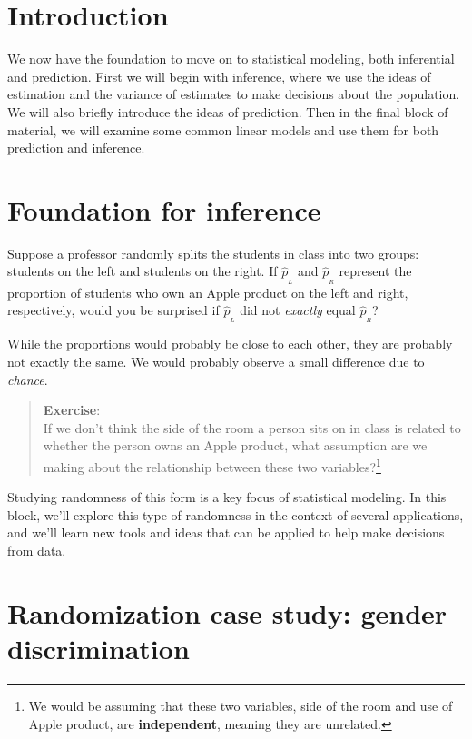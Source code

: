 \documentclass[
  letterpaper,
  DIV=11,
  numbers=noendperiod]{scrreprt}
\begin{document}
\section{Introduction}\label{introduction}

We now have the foundation to move on to statistical modeling, both
inferential and prediction. First we will begin with inference, where we
use the ideas of estimation and the variance of estimates to make
decisions about the population. We will also briefly introduce the ideas
of prediction. Then in the final block of material, we will examine some
common linear models and use them for both prediction and inference.

\section{Foundation for inference}\label{foundation-for-inference}

Suppose a professor randomly splits the students in class into two
groups: students on the left and students on the right. If
\(\hat{p}_{_L}\) and \(\hat{p}_{_R}\) represent the proportion of
students who own an Apple product on the left and right, respectively,
would you be surprised if \(\hat{p}_{_L}\) did not \emph{exactly} equal
\(\hat{p}_{_R}\)?

While the proportions would probably be close to each other, they are
probably not exactly the same. We would probably observe a small
difference due to \emph{chance}.

\begin{quote}
\textbf{Exercise}:\\
If we don't think the side of the room a person sits on in class is
related to whether the person owns an Apple product, what assumption are
we making about the relationship between these two variables?\footnote{We
  would be assuming that these two variables, side of the room and use
  of Apple product, are \textbf{independent}, meaning they are
  unrelated.}
\end{quote}

Studying randomness of this form is a key focus of statistical modeling.
In this block, we'll explore this type of randomness in the context of
several applications, and we'll learn new tools and ideas that can be
applied to help make decisions from data.

\section{Randomization case study: gender
discrimination}\label{randomization-case-study-gender-discrimination}
\end{document}
